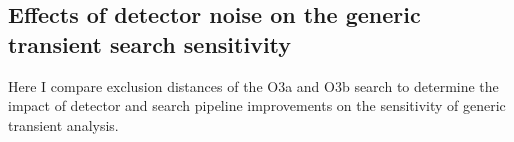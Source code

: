 %     



\subsection{Effects of detector noise on the generic transient search sensitivity}\label{sec:grb-o3b-noise}

Here I compare exclusion distances of the O3a and O3b search to determine the impact of detector and search pipeline improvements on the sensitivity of generic transient analysis.
